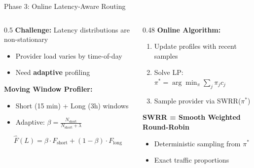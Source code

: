 \documentclass[aspectratio=169,10pt]{beamer}
\begin{document}
\begin{frame}{Phase 3: Online Latency-Aware Routing}
\vspace{-0.3cm}
\begin{columns}[T]
\begin{column}{0.5\textwidth}
\footnotesize
\textbf{Challenge:} Latency distributions are \alert{non-stationary}
\begin{itemize}\setlength{\itemsep}{0pt}
    \item Provider load varies by time-of-day
    \item Need \textbf{adaptive} profiling
\end{itemize}

\vspace{0.15cm}
\textbf{Moving Window Profiler:}
\begin{itemize}\setlength{\itemsep}{0pt}
    \item Short (15 min) + Long (3h) windows
    \item Adaptive: $\beta = \frac{N_{\text{short}}}{N_{\text{short}} + \lambda}$
\end{itemize}
\[
\hat{F}(L) = \beta \cdot F_{\text{short}} + (1-\beta) \cdot F_{\text{long}}
\]
\end{column}

\begin{column}{0.48\textwidth}
\footnotesize
\textbf{Online Algorithm:}
\begin{enumerate}\setlength{\itemsep}{0pt}
    \item Update profiles with recent samples
    \item Solve LP: $\pi^* = \arg\min_\pi \sum_j \pi_j c_j$
    \item Sample provider via SWRR($\pi^*$)
\end{enumerate}

\vspace{0.15cm}
\textbf{SWRR = Smooth Weighted Round-Robin}
\begin{itemize}\setlength{\itemsep}{0pt}
    \item Deterministic sampling from $\pi^*$
    \item Exact traffic proportions
\end{itemize}
\end{column}
\end{columns}
\end{frame}
\end{document}
